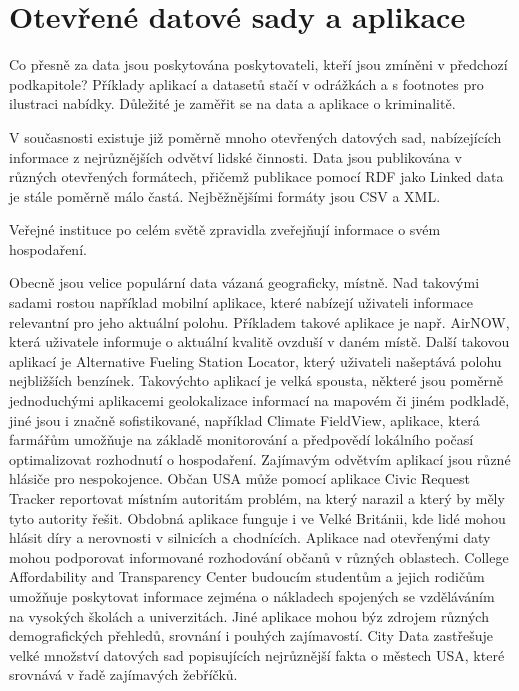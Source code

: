 \section{Otevřené datové sady a aplikace}

Co přesně za data jsou poskytována poskytovateli, kteří jsou zmíněni v předchozí podkapitole?
Příklady aplikací a datasetů stačí v odrážkách a s footnotes pro ilustraci nabídky. Důležité je zaměřit se na data a aplikace o kriminalitě.


V současnosti existuje již poměrně mnoho otevřených datových sad, nabízejících informace z nejrůznějších odvětví lidské činnosti. Data jsou publikována v různých otevřených formátech, přičemž publikace pomocí RDF jako Linked data je stále poměrně málo častá. Nejběžnějšími formáty jsou CSV a XML.

Veřejné instituce po celém světě zpravidla zveřejňují informace o svém hospodaření.

Obecně jsou velice populární data vázaná geograficky, místně. Nad takovými sadami rostou například mobilní aplikace, které nabízejí uživateli informace relevantní pro jeho aktuální polohu. Příkladem takové aplikace je např. AirNOW, která uživatele informuje o aktuální kvalitě ovzduší v daném místě. Další takovou aplikací je Alternative Fueling Station Locator, který uživateli našeptává polohu nejbližších benzínek. Takovýchto aplikací je velká spousta, některé jsou poměrně jednoduchými aplikacemi geolokalizace informací na mapovém či jiném podkladě, jiné jsou i značně sofistikované, například Climate FieldView, aplikace, která farmářům umožňuje na základě monitorování a předpovědí lokálního počasí optimalizovat rozhodnutí o hospodaření.
Zajímavým odvětvím aplikací jsou různé hlásiče pro nespokojence. Občan USA může pomocí aplikace Civic Request Tracker reportovat místním autoritám problém, na který narazil a který by měly tyto autority řešit. Obdobná aplikace funguje i ve Velké Británii, kde lidé mohou hlásit díry a nerovnosti v silnicích a chodnících.
Aplikace nad otevřenými daty mohou podporovat informované rozhodování občanů v různých oblastech. College Affordability and Transparency Center budoucím studentům a jejich rodičům umožňuje poskytovat informace zejména o nákladech spojených se vzděláváním na vysokých školách a univerzitách.
Jiné aplikace mohou býz zdrojem různých demografických přehledů, srovnání i pouhých zajímavostí. City Data zastřešuje velké množství datových sad popisujících nejrůznější fakta o městech USA, které srovnává v řadě zajímavých žebříčků.

